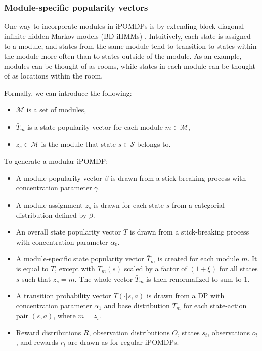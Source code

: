 \documentclass[11pt]{article}
\begin{document}
\subsubsection{Module-specific popularity vectors}

One way to incorporate modules in iPOMDPs is by extending block diagonal infinite hidden Markov models (BD-iHMMs) \cite{Stepleton2009}. Intuitively, each state is assigned to a module, and states from the same module tend to transition to states within the module more often than to states outside of the module. As an example, modules can be thought of as rooms, while states in each module can be thought of as locations within the room.

Formally, we can introduce the following:

\begin{itemize}
\item $\mathcal{M}$ is a set of modules,
\item $\bar{T}_m$ is a state popularity vector for each module $m \in \mathcal{M}$,
\item $z_s \in \mathcal{M}$ is the module that state $s \in \mathcal{S}$ belongs to.
\end{itemize}

To generate a modular iPOMDP:

\begin{itemize}
\item A module popularity vector $\beta$ is drawn from a stick-breaking process with concentration parameter $\gamma$.
\item A module assignment $z_s$ is drawn for each state $s$ from a categorial distribution defined by $\beta$.
\item An overall state popularity vector $\bar{T}$ is drawn from a stick-breaking process with concentration parameter $\alpha_0$.
\item A module-specific state popularity vector $\bar{T}_m$ is created for each module $m$. It is equal to $\bar{T}$, except with $\bar{T}_m(s)$ scaled by a factor of $(1 + \xi)$ for all states $s$ such that $z_s = m$. The whole vector $\bar{T}_m$ is then renormalized to sum to 1.
\item A transition probability vector $T(\cdot | s,a)$ is drawn from a DP with concentration parameter $\alpha_1$ and base distribution $\bar{T}_m$ for each state-action pair $(s,a)$, where $m = z_s$.
\item Reward distributions $R$, observation distributions $O$, states $s_t$, observations $o_t$, and rewards $r_t$ are drawn as for regular iPOMDPs.
\end{itemize}
\end{document}
